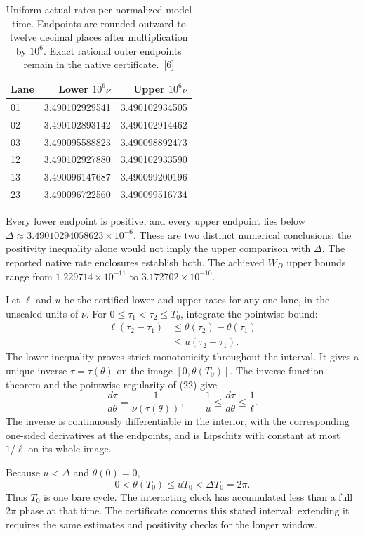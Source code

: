 \documentclass[10pt,twocolumn,letterpaper]{article}
\begin{document}
\begin{table}[H]
\centering
\small
\begin{tabular*}{\columnwidth}{@{\extracolsep{\fill}}lrr@{}}
\toprule
Lane & Lower $10^6\nu$ & Upper $10^6\nu$ \\
\midrule
01 & 3.490102929541 & 3.490102934505 \\
02 & 3.490102893142 & 3.490102914462 \\
03 & 3.490095588823 & 3.490098892473 \\
12 & 3.490102927880 & 3.490102933590 \\
13 & 3.490096147687 & 3.490099200196 \\
23 & 3.490096722560 & 3.490099516734 \\
\bottomrule
\end{tabular*}
\caption{Uniform actual rates per normalized model time. Endpoints are rounded outward to twelve decimal places after multiplication by $10^6$. Exact rational outer endpoints remain in the native certificate.~[6]}
\end{table}

Every lower endpoint is positive, and every upper endpoint lies below $\Delta\approx3.49010294058623\times10^{-6}$. These are two distinct numerical conclusions: the positivity inequality alone would not imply the upper comparison with $\Delta$. The reported native rate enclosures establish both. The achieved $W_D$ upper bounds range from $1.229714\times10^{-11}$ to $3.172702\times10^{-10}$.

Let $\ell$ and $u$ be the certified lower and upper rates for any one lane, in the unscaled units of $\nu$. For $0\le\tau_1<\tau_2\le T_0$, integrate the pointwise bound:
\[
\begin{aligned}
\ell(\tau_2-\tau_1)
&\le\theta(\tau_2)-\theta(\tau_1)\\
&\le u(\tau_2-\tau_1).
\end{aligned}
\]
The lower inequality proves strict monotonicity throughout the interval. It gives a unique inverse $\tau=\tau(\theta)$ on the image $[0,\theta(T_0)]$. The inverse function theorem and the pointwise regularity of (22) give
\[
\frac{d\tau}{d\theta}
=\frac{1}{\nu(\tau(\theta))},
\qquad
\frac1u\le\frac{d\tau}{d\theta}\le\frac1\ell.
\]
The inverse is continuously differentiable in the interior, with the corresponding one-sided derivatives at the endpoints, and is Lipschitz with constant at most $1/\ell$ on its whole image.

Because $u<\Delta$ and $\theta(0)=0$,
\[
0<\theta(T_0)\le uT_0<\Delta T_0=2\pi.
\]
Thus $T_0$ is one bare cycle. The interacting clock has accumulated less than a full $2\pi$ phase at that time. The certificate concerns this stated interval; extending it requires the same estimates and positivity checks for the longer window.
\end{document}
